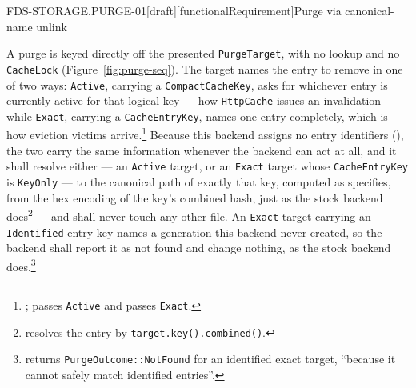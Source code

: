 \begin{requirement}{FDS-STORAGE.PURGE-01}[draft][functionalRequirement]{Purge via canonical-name unlink}


  A purge is keyed directly off the presented \texttt{PurgeTarget}, with
  no lookup and no \texttt{CacheLock} (Figure~\ref{fig:purge-seq}). The target names the
  entry to remove in one of two ways: \texttt{Active}, carrying a
  \texttt{CompactCacheKey}, asks for whichever entry is currently active for
  that logical key --- how \texttt{HttpCache} issues an invalidation ---
  while \texttt{Exact}, carrying a \texttt{CacheEntryKey}, names one entry
  completely, which is how eviction victims arrive.\footnote{;
   passes
  \texttt{Active} and 
  passes \texttt{Exact}.} Because this backend assigns no entry identifiers
  (), the two carry the same information whenever
  the backend can act at all, and it shall resolve either --- an \texttt{Active}
  target, or an \texttt{Exact} target whose \texttt{CacheEntryKey} is
  \texttt{KeyOnly} --- to the canonical path of exactly that key, computed as
   specifies, from the hex encoding of the
  key's combined hash, just as the stock backend
  does\footnote{
  resolves the entry by \texttt{target.key().combined()}.} --- and shall never touch
  any other file. An \texttt{Exact} target carrying an \texttt{Identified}
  entry key names a generation this backend never created, so the backend
  shall report it as not found and change nothing, as the stock backend
  does.\footnote{
  returns \texttt{PurgeOutcome::NotFound} for an identified exact target,
  ``because it cannot safely match identified entries''.}


\end{requirement}
